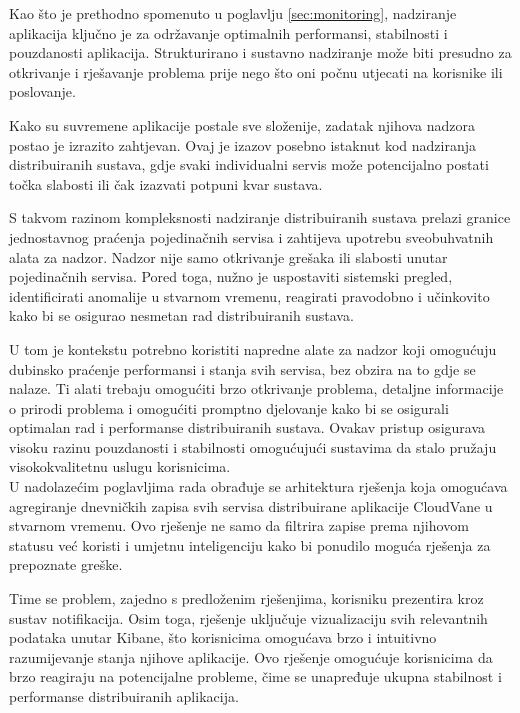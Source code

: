 \documentclass[times, utf8, diplomski]{fer}
\begin{document}
Kao što je prethodno spomenuto u poglavlju \ref{sec:monitoring}, nadziranje aplikacija ključno je za održavanje optimalnih performansi, stabilnosti i pouzdanosti aplikacija. Strukturirano i sustavno nadziranje može biti presudno za otkrivanje i rješavanje problema prije nego što oni počnu utjecati na korisnike ili poslovanje.

Kako su suvremene aplikacije postale sve složenije, zadatak njihova nadzora postao je izrazito zahtjevan. Ovaj je izazov posebno istaknut kod nadziranja distribuiranih sustava, gdje svaki individualni servis može potencijalno postati točka slabosti ili čak izazvati potpuni kvar sustava.

S takvom razinom kompleksnosti nadziranje distribuiranih sustava prelazi granice jednostavnog praćenja pojedinačnih servisa i zahtijeva upotrebu sveobuhvatnih alata za nadzor. Nadzor nije samo otkrivanje grešaka ili slabosti unutar pojedinačnih servisa. Pored toga, nužno je uspostaviti sistemski pregled, identificirati anomalije u stvarnom vremenu, reagirati pravodobno i učinkovito kako bi se osigurao nesmetan rad distribuiranih sustava.

U tom je kontekstu potrebno koristiti napredne alate za nadzor koji omogućuju dubinsko praćenje performansi i stanja svih servisa, bez obzira na to gdje se nalaze. Ti alati trebaju omogućiti brzo otkrivanje problema, detaljne informacije o prirodi problema i omogućiti promptno djelovanje kako bi se osigurali optimalan rad i performanse distribuiranih sustava. Ovakav pristup osigurava visoku razinu pouzdanosti i stabilnosti omogućujući sustavima da stalo pružaju visokokvalitetnu uslugu korisnicima.\\

U nadolazećim poglavljima rada obrađuje se arhitektura rješenja koja omogućava agregiranje dnevničkih zapisa svih servisa distribuirane aplikacije CloudVane u stvarnom vremenu. Ovo rješenje ne samo da filtrira zapise prema njihovom statusu već koristi i umjetnu inteligenciju kako bi ponudilo moguća rješenja za prepoznate greške.

Time se problem, zajedno s predloženim rješenjima, korisniku prezentira kroz sustav notifikacija. Osim toga, rješenje uključuje vizualizaciju svih relevantnih podataka unutar Kibane, što korisnicima omogućava brzo i intuitivno razumijevanje stanja njihove aplikacije. Ovo rješenje omogućuje korisnicima da brzo reagiraju na potencijalne probleme, čime se unapređuje ukupna stabilnost i performanse distribuiranih aplikacija.
\end{document}
